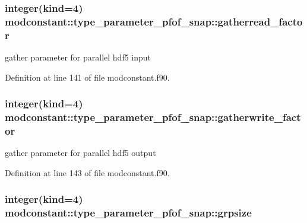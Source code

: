 \subsubsection[{\texorpdfstring{gatherread\+\_\+factor}{gatherread_factor}}]{\setlength{\rightskip}{0pt plus 5cm}integer(kind=4) modconstant\+::type\+\_\+parameter\+\_\+pfof\+\_\+snap\+::gatherread\+\_\+factor}\hypertarget{structmodconstant_1_1type__parameter__pfof__snap_a078d7fad865fe3a66900699ea0a786da}{}\label{structmodconstant_1_1type__parameter__pfof__snap_a078d7fad865fe3a66900699ea0a786da}


gather parameter for parallel hdf5 input 



Definition at line 141 of file modconstant.\+f90.

\subsubsection[{\texorpdfstring{gatherwrite\+\_\+factor}{gatherwrite_factor}}]{\setlength{\rightskip}{0pt plus 5cm}integer(kind=4) modconstant\+::type\+\_\+parameter\+\_\+pfof\+\_\+snap\+::gatherwrite\+\_\+factor}\hypertarget{structmodconstant_1_1type__parameter__pfof__snap_afef04e15a6cc8639d9852b08b737927e}{}\label{structmodconstant_1_1type__parameter__pfof__snap_afef04e15a6cc8639d9852b08b737927e}


gather parameter for parallel hdf5 output 



Definition at line 143 of file modconstant.\+f90.

\subsubsection[{\texorpdfstring{grpsize}{grpsize}}]{\setlength{\rightskip}{0pt plus 5cm}integer(kind=4) modconstant\+::type\+\_\+parameter\+\_\+pfof\+\_\+snap\+::grpsize}\hypertarget{structmodconstant_1_1type__parameter__pfof__snap_a65535bf9bcf3c053b3828d83e2f40271}{}\label{structmodconstant_1_1type__parameter__pfof__snap_a65535bf9bcf3c053b3828d83e2f40271}


